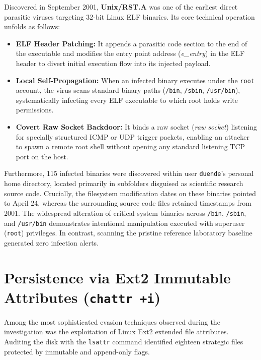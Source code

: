 \begin{notaforense}
Discovered in September 2001, \textbf{Unix/RST.A} was one of the earliest direct parasitic viruses targeting 32-bit Linux ELF binaries. Its core technical operation unfolds as follows:
\begin{itemize}
    \item \textbf{ELF Header Patching:} It appends a parasitic code section to the end of the executable and modifies the entry point address (\textit{e\_entry}) in the ELF header to divert initial execution flow into its injected payload.
    \item \textbf{Local Self-Propagation:} When an infected binary executes under the \texttt{root} account, the virus scans standard binary paths (\texttt{/bin}, \texttt{/sbin}, \texttt{/usr/bin}), systematically infecting every ELF executable to which root holds write permissions.
    \item \textbf{Covert Raw Socket Backdoor:} It binds a raw socket (\textit{raw socket}) listening for specially structured ICMP or UDP trigger packets, enabling an attacker to spawn a remote root shell without opening any standard listening TCP port on the host.
\end{itemize}
\end{notaforense}

Furthermore, 115 infected binaries were discovered within user \texttt{duende}'s personal home directory, located primarily in subfolders disguised as scientific research source code. Crucially, the filesystem modification dates on these binaries pointed to April 24, whereas the surrounding source code files retained timestamps from 2001. The widespread alteration of critical system binaries across \texttt{/bin}, \texttt{/sbin}, and \texttt{/usr/bin} demonstrates intentional manipulation executed with superuser (\texttt{root}) privileges. In contrast, scanning the pristine reference laboratory baseline generated zero infection alerts.

\section{Persistence via Ext2 Immutable Attributes (\texttt{chattr +i})}

Among the most sophisticated evasion techniques observed during the investigation was the exploitation of Linux Ext2 extended file attributes. Auditing the disk with the \texttt{lsattr} command identified eighteen strategic files protected by immutable and append-only flags.

